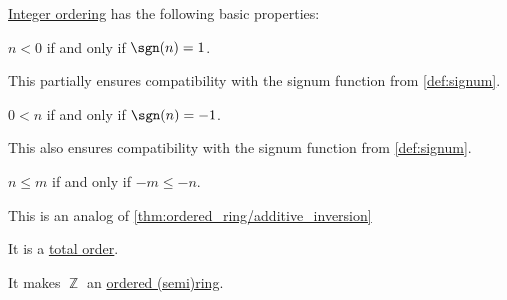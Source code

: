 \begin{proposition}\label{thm:def:integer_ordering}
  \hyperref[def:integer_ordering]{Integer ordering} has the following basic properties:
  \begin{thmenum}
     \( n < 0 \) if and only if \( \sgn(n) = 1 \).

    This partially ensures compatibility with the signum function from \cref{def:signum}.

     \( 0 < n \) if and only if \( \sgn(n) = -1 \).

    This also ensures compatibility with the signum function from \cref{def:signum}.

     \( n \leq m \) if and only if \( -m \leq -n \).

    This is an analog of \cref{thm:ordered_ring/additive_inversion}

     It is a \hyperref[def:totally_ordered_set]{total order}.

     It makes \( \BbbZ \) an \hyperref[def:ordered_semiring]{ordered (semi)ring}.
  \end{thmenum}
\end{proposition}
